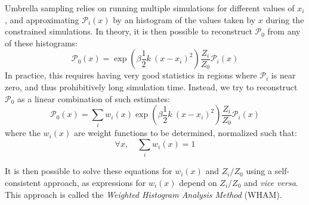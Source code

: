 \documentclass[thesis]{subfiles}
\begin{document}
Umbrella sampling relies on running multiple simulations for different values of
$x_i$, and approximating $\mathcal{P}_i(x)$ by an histogram of the values taken
by $x$ during the constrained simulations. In theory, it is then possible to
reconstruct $\mathcal{P}_0$ from any of these histograms:
\[ \mathcal{P}_0(x) = \exp\left(\beta \frac 12 k\ (x - x_i)^2\right) \frac{Z_i}{Z_0} \mathcal{P}_i(x) \]
In practice, this requires having very good statistics in regions where
$\mathcal{P}_i$ is near zero, and thus prohibitively long simulation time.
Instead, we try to reconstruct $\mathcal{P}_0$ as a linear combination of such
estimates:
\[ \mathcal{P}_0(x) = \sum_i w_i(x) \exp\left(\beta \frac 12 k\ (x - x_i)^2\right) \frac{Z_i}{Z_0} \mathcal{P}_i(x) \]
where the $w_i(x)$ are weight functions to be determined, normalized such that:
\[ \forall x, \quad \sum_i w_i(x) = 1\]

It is then possible to solve these equations for $w_i(x)$ and $Z_i/Z_0$ using a
self-consistent approach, as expressions for $w_i(x)$ depend on $Z_i/Z_0$ and
\emph{vice versa}. This approach is called the \emph{Weighted Histogram Analysis
Method}\cite{Kumar1995} (WHAM).

\OnlyInSubfile{\printbibliography}
\end{document}
